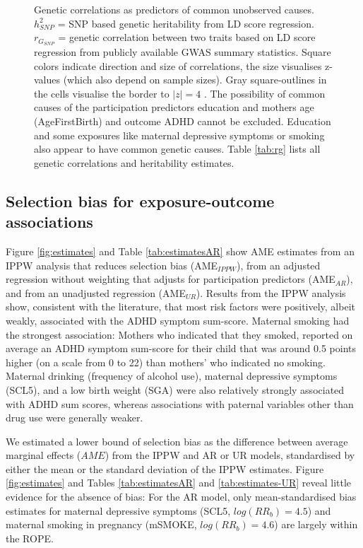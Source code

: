 \documentclass[12pt]{article}
\begin{document}
\begin{figure}
	\begin{center}
	\end{center}
	\caption{Genetic correlations as predictors of common unobserved causes. $h^2_{SNP}$ = SNP based genetic heritability from LD score regression. $r_{G_{SNP}}$ = genetic correlation between two traits based on LD score regression from publicly available GWAS summary statistics. Square colors indicate direction and size of correlations, the size visualises z-values (which also depend on sample sizes). Gray square-outlines in the cells visualise the border to $|z|=4$ . The possibility of common causes of the participation predictors education and mothers age (AgeFirstBirth) and outcome ADHD cannot be excluded. Education and some exposures like maternal depressive symptoms or smoking also appear to have common genetic causes. Table \ref{tab:rg} lists all genetic correlations and heritability estimates.}
	\label{fig:rg}
\end{figure}

\subsection*{Selection bias for exposure-outcome associations}
Figure \ref{fig:estimates} and Table \ref{tab:estimatesAR} show AME estimates from an IPPW analysis that reduces selection bias (AME$_{IPPW}$), from an adjusted regression without weighting that adjusts for participation predictors (AME$_{AR}$), and from an unadjusted regression (AME$_{UR}$). Results from the IPPW analysis show, consistent with the literature, that most risk factors were positively, albeit weakly, associated with the ADHD symptom sum-score. Maternal smoking had the strongest association: Mothers who indicated that they smoked, reported on average an ADHD symptom sum-score for their child that was around 0.5 points higher (on a scale from 0 to 22) than mothers' who indicated no smoking. Maternal drinking (frequency of alcohol use), maternal depressive symptoms (SCL5), and a low birth weight (SGA) were also relatively strongly associated with ADHD sum scores, whereas associations with paternal variables other than drug use were generally weaker.

We estimated a lower bound of selection bias as the difference between average marginal effects ($AME$) from the IPPW and AR or UR models, standardised by either the mean or the standard deviation of the IPPW estimates. Figure \ref{fig:estimates} and Tables \ref{tab:estimatesAR} and \ref{tab:estimates-UR} reveal little evidence for the absence of bias: For the AR model, only mean-standardised bias estimates for maternal depressive symptoms (SCL5, $log(RR_b)=4.5$) and maternal smoking in pregnancy (mSMOKE, $log(RR_b)=4.6$) are largely within the ROPE. 
\end{document}
